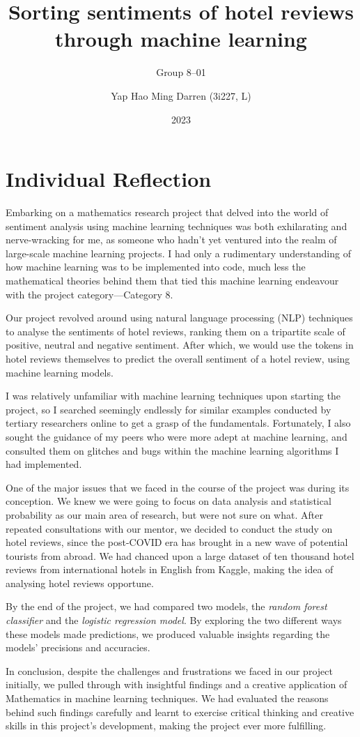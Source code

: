 \documentclass[12pt,a4paper,bibliography=totocnumbered]{scrartcl}
\title{Sorting sentiments of hotel reviews through machine learning}
\subtitle{Group 8--01}
\author{Yap Hao Ming Darren (3i227, L)}
\date{2023}
\def\it#1{\textit{#1}}
\begin{document}
\doublespacing
\maketitle
\tableofcontents
\section{Individual Reflection}
Embarking on a mathematics research project
that delved into the world of sentiment analysis
using machine learning techniques was both exhilarating
and nerve-wracking for me, as someone who hadn't yet ventured
into the realm of large-scale machine learning projects.
I had only a rudimentary understanding of how machine
learning was to be implemented into code, much less
the mathematical theories behind them that tied
this machine learning endeavour with the project category---Category 8.

Our project revolved around using natural language processing
(NLP) techniques to analyse the sentiments of hotel reviews,
ranking them on a tripartite scale of positive, neutral
and negative sentiment. After which, we would use
the tokens in hotel reviews themselves to predict
the overall sentiment of a hotel review, using machine learning
models.

I was relatively unfamiliar with machine learning
techniques upon starting the project, so I searched
seemingly endlessly for similar examples conducted
by tertiary researchers online to get a grasp
of the fundamentals. Fortunately, I also sought
the guidance of my peers who were more adept at
machine learning, and consulted them
on glitches and bugs within
the machine learning algorithms I had implemented.

One of the major issues that we faced in the course
of the project was during its conception. We knew
we were going to focus on data analysis and
statistical probability as our main area of research,
but were not sure on what. After repeated
consultations with our mentor, we decided to conduct
the study on hotel reviews, since the post-COVID
era has brought in a new wave of potential tourists
from abroad. We had chanced upon a large
dataset of ten thousand hotel reviews
from international hotels in English from Kaggle,
making the idea of analysing hotel reviews opportune.

By the end of the project, we had compared two models, the
\it{random forest classifier} and the \it{logistic regression model}.
By exploring the two different ways these models made predictions,
we produced valuable insights regarding the models' precisions
and accuracies.

In conclusion, despite the challenges and frustrations
we faced in our project initially, we pulled through
with insightful findings and a creative application
of Mathematics in machine learning techniques. We
had evaluated the reasons behind such findings carefully
and learnt to exercise critical thinking and creative
skills in this project's development, making
the project ever more fulfilling.
\end{document}
